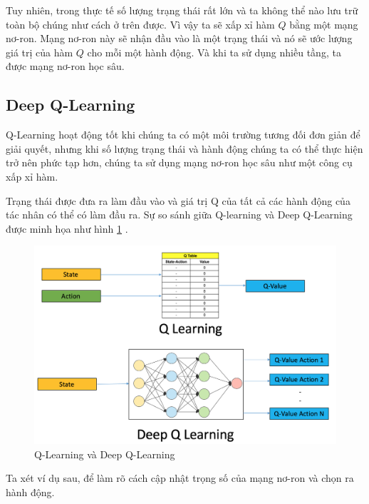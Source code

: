 Tuy nhiên, trong thực tế số lượng trạng thái rất lớn và ta không thể nào lưu trữ toàn bộ chúng như cách ở trên được. Vì vậy ta sẽ xấp xỉ hàm $Q$ bằng một mạng nơ-ron. Mạng nơ-ron này sẽ nhận đầu vào là một trạng thái và nó sẽ ước lượng giá trị của hàm $Q$ cho mỗi một hành động. Và khi ta sử dụng nhiều tầng, ta được mạng nơ-ron học sâu.

\subsection{Deep Q-Learning}
\label{subsec:deepqlearning}
Q-Learning hoạt động tốt khi chúng ta có một môi trường tương đối đơn giản để giải quyết, nhưng khi số lượng trạng thái và hành động chúng ta có thể thực hiện trở nên phức tạp hơn, chúng ta sử dụng mạng nơ-ron học sâu như một công cụ xấp xỉ hàm.

Trạng thái được đưa ra làm đầu vào và giá trị Q của tất cả các hành động của tác nhân có thể có làm đầu ra. Sự so sánh giữa Q-learning và Deep Q-Learning được minh họa như hình \ref{fig:dqlearning} \cite{introductiondeepqlearningpython}.

\begin{center}
    \begin{figure}[h!]
        \begin{center}
         \includegraphics[scale=0.27]{chapter3/img/dqlearning.png}
        \end{center}
        \caption{Q-Learning và Deep Q-Learning}
        \label{fig:dqlearning}
    \end{figure}
\end{center}

Ta xét ví dụ sau, để làm rõ cách cập nhật trọng số của mạng nơ-ron và chọn ra hành động.

